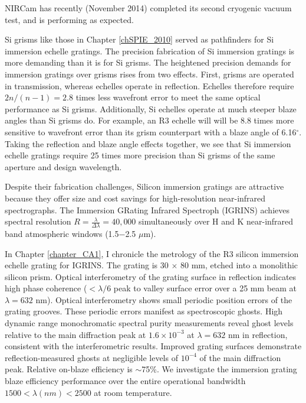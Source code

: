 NIRCam has recently (November 2014) completed its second cryogenic vacuum test, and is performing as expected.

Si grisms like those in Chapter \ref{chSPIE_2010} served as pathfinders for Si immersion echelle gratings.  The precision fabrication of Si immersion gratings is more demanding than it is for Si grisms.  The heightened precision demands for immersion gratings over grisms rises from two effects.  First, grisms are operated in transmission, whereas echelles operate in reflection.  Echelles therefore require $2n/(n-1) = 2.8$ times less wavefront error to meet the same optical performance as Si grisms.  Additionally, Si echelles operate at much steeper blaze angles than Si grisms do.  For example, an R3 echelle will will be 8.8 times more sensitive to wavefront error than its grism counterpart with a blaze angle of 6.16$^\circ$.  Taking the reflection and blaze angle effects together, we see that Si immersion echelle gratings require 25 times more precision than Si grisms of the same aperture and design wavelength.  

Despite their fabrication challenges, Silicon immersion gratings are attractive because they offer size and cost savings for high-resolution near-infrared spectrographs.  The Immersion GRating Infrared Spectroph (IGRINS) \cite{} achieves spectral resolution $R=\frac{\lambda}{\Delta \lambda} = 40,000$ simultaneously over H and K near-infrared band atmospheric windows (1.5$-$2.5 $\mu$m).  

In Chapter \ref{chapter_CA1}, I chronicle the metrology of the R3 silicon immersion echelle grating for IGRINS.  The grating is 30 $\times$ 80 mm, etched into a monolithic silicon prism.  Optical interferometry of the grating surface in reflection indicates high phase coherence ($< \lambda/6$ peak to valley surface error over a 25 mm beam at $\lambda=632$ nm).  Optical interferometry shows small periodic position errors of the grating grooves.  These periodic errors manifest as spectroscopic ghosts.  High dynamic range monochromatic spectral purity measurements reveal ghost levels relative to the main diffraction peak at $1.6 \times 10^{-3}$ at $\lambda = 632$ nm in reflection, consistent with the interferometric results.  Improved grating surfaces demonstrate reflection-measured ghosts at negligible levels of $10^{-4}$ of the main diffraction peak.  Relative on-blaze efficiency is $\sim$75\%.  We investigate the immersion grating blaze efficiency performance over the entire operational bandwidth $1500 < \lambda(nm) < 2500$ at room temperature.

